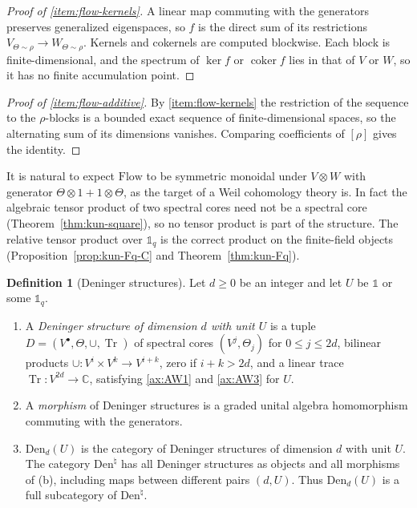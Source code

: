 \documentclass[11pt]{amsart}
\theoremstyle{plain}
\theoremstyle{definition}
\newtheorem{definition}[theorem]{Definition}
\theoremstyle{remark}
\numberwithin{equation}{section}
\newcommand{\C}{\mathbb{C}}
\newcommand{\Den}{\mathrm{Den}}
\newcommand{\Flow}{\mathrm{Flow}}
\DeclareMathOperator{\Tr}{Tr}
\begin{document}
\begin{proof}[Proof of \eqref{item:flow-kernels}]
A linear map commuting with the generators preserves generalized
eigenspaces, so $f$ is the direct sum of its restrictions
$V_{\Theta\sim\rho}\to W_{\Theta\sim\rho}$. Kernels and cokernels are
computed blockwise. Each block is finite-dimensional, and the spectrum
of $\ker f$ or $\operatorname{coker}f$ lies in that of $V$ or $W$, so
it has no finite accumulation point.
\end{proof}

\begin{proof}[Proof of \eqref{item:flow-additive}]
By \eqref{item:flow-kernels} the restriction of the sequence to the
$\rho$-blocks is a bounded exact sequence of finite-dimensional
spaces, so the alternating sum of its dimensions vanishes. Comparing
coefficients of $[\rho]$ gives the identity.
\end{proof}

It is natural to expect $\Flow$ to be symmetric monoidal under
$V\otimes W$ with generator $\Theta\otimes1+1\otimes\Theta$, as the
target of a Weil cohomology theory is. In fact the algebraic tensor
product of two spectral cores need not be a spectral core
(Theorem~\ref{thm:kun-square}), so no tensor product is part of the
structure. The relative tensor product over $\mathbb 1_q$ is the
correct product on the finite-field objects
(Proposition~\ref{prop:kun-Fq-C} and Theorem~\ref{thm:kun-Fq}).

\begin{definition}[Deninger structures]
\label{def:deninger-structure}
Let $d\ge0$ be an integer and let $U$ be $\mathbb 1$ or some
$\mathbb 1_q$.
\begin{enumerate}[label=(\alph*)]
\item A \emph{Deninger structure of dimension $d$ with unit $U$} is a
  tuple $D=(V^\bullet,\Theta,\cup,\Tr)$ of spectral cores
  $(V^j,\Theta_j)$ for $0\le j\le2d$, bilinear products
  $\cup:V^i\times V^k\to V^{i+k}$, zero if $i+k>2d$, and a linear
  trace $\Tr:V^{2d}\to\C$, satisfying \ref{ax:AW1} and \ref{ax:AW3}
  for $U$.
\item A \emph{morphism} of Deninger structures is a graded unital
  algebra homomorphism commuting with the generators.
\item $\Den_d(U)$ is the category of Deninger structures of dimension
  $d$ with unit $U$. The category $\Den^\natural$ has all Deninger
  structures as objects and all morphisms of (b), including maps
  between different pairs $(d,U)$. Thus $\Den_d(U)$ is a full
  subcategory of $\Den^\natural$.
\end{enumerate}
\end{definition}
\end{document}
